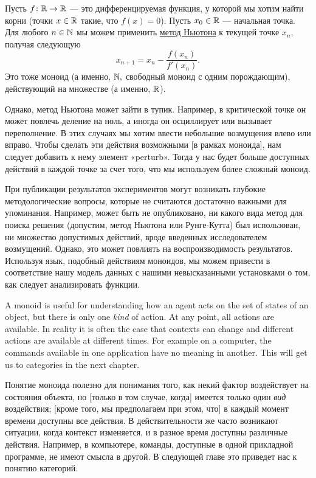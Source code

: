\documentclass[CT4S-EN-RU]{subfiles}
\begin{document}
\begin{applicationRUS}
Пусть $f\colon{\mathbb R}\rightarrow{\mathbb R}$ — это дифференцируемая функция, у которой мы хотим найти корни (точки $x\in{\mathbb R}$ такие, что $f(x)=0$). Пусть $x_0\in{\mathbb R}$ — начальная точка. Для любого $n\in{\mathbb N}$ мы можем применить \href{https://ru.wikipedia.org/wiki/%D0%9C%D0%B5%D1%82%D0%BE%D0%B4_%D0%9D%D1%8C%D1%8E%D1%82%D0%BE%D0%BD%D0%B0}{\text метод Ньютона} к текущей точке $x_n,$ получая следующую $$x_{n+1}=x_n-\frac{f(x_n)}{f'(x_n)}.$$
Это тоже моноид (а именно, ${\mathbb N},$ свободный моноид с одним порождающим), действующий на множестве (а именно, ${\mathbb R}$).

Однако, метод Ньютона может зайти в тупик. Например, в критической точке он может повлечь деление на ноль, а иногда он осциллирует или вызывает переполнение. В этих случаях мы хотим ввести небольшие возмущения влево или вправо. Чтобы сделать эти действия возможными [в рамках моноида], нам следует добавить к нему элемент «perturb». Тогда у нас будет больше доступных действий в каждой точке за счет того, что мы используем более сложный моноид.

При публикации результатов экспериментов могут возникать глубокие методологические вопросы, которые не считаются достаточно важными для упоминания. Например, может быть не опубликовано, ни какого вида метод для поиска решения (допустим, метод Ньютона или Рунге-Кутта) был использован, ни множество допустимых действий, вроде введенных исследователем возмущений. Однако, это может повлиять на воспроизводимость результатов. Используя язык, подобный действиям моноидов, мы можем привести в соответствие нашу модель данных с нашими невысказанными установками о том, как следует анализировать функции.
\end{applicationRUS}

\begin{remarkENG}
A monoid is useful for understanding how an agent acts on the set of states of an object, but there is only one {\em kind} of action. At any point, all actions are available. In reality it is often the case that contexts can change and different actions are available at different times. For example on a computer, the commands available in one application have no meaning in another. This will get us to categories in the next chapter.
\end{remarkENG}

\begin{remarkRUS}
Понятие моноида полезно для понимания того, как некий фактор воздействует на состояния объекта, но [только в том случае, когда] имеется только один {\em вид} воздействия; [кроме того, мы предполагаем при этом, что] в каждый момент времени доступны все действия. В действительности же часто возникают ситуации, когда контекст изменяется, и в разное время доступны различные действия. Например, в компьютере, команды, доступные в одной прикладной программе, не имеют смысла в другой. В следующей главе это приведет нас к понятию категорий.
\end{remarkRUS}
\end{document}
